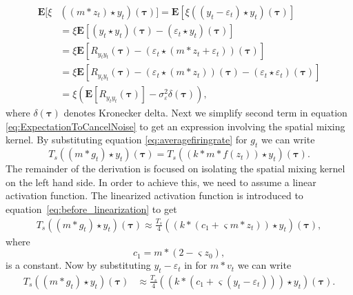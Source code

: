 \documentclass[10pt,twocolumn,twoside]{IEEEtran}
\begin{document}
\begin{align}
	\mathbf{E}[\xi&\left(\left(m \ast z_t \right) \star y_t \right)(\boldsymbol{\tau})] = \mathbf{E}\left[\xi\left(\left(y_t-\varepsilon_t\right) \star y_t \right)(\boldsymbol{\tau})\right] \nonumber \\
	&= \xi \mathbf{E}\left[ (y_t \star y_t)(\boldsymbol{\tau}) - \left(\varepsilon_t\star y_t \right)(\boldsymbol{\tau})\right] \nonumber \\
	&= \xi\mathbf{E}[ R_{y_ty_t}(\boldsymbol{\tau})  - \left(\varepsilon_t \star (m\ast z_t + \varepsilon_t)\right) (\boldsymbol{\tau})] \nonumber \\
	&=\xi\mathbf{E}[ R_{y_ty_t}(\boldsymbol{\tau}) -\left(\varepsilon_t\star (m\ast z_t)\right)(\boldsymbol{\tau}) - (\varepsilon_t\star\varepsilon_t)(\boldsymbol{\tau})] \nonumber\\ 
	&= \xi\left(\mathbf{E}[ R_{y_ty_t}(\boldsymbol{\tau})] - \sigma_{\varepsilon}^2 \delta(\boldsymbol{\tau})\right), \label{eq:FirstTermReduced}
\end{align}
where $\delta(\boldsymbol\tau)$ denotes Kronecker delta.
Next we simplify second term in equation \eqref{eq:ExpectationToCancelNoise} to get an expression involving the spatial mixing kernel.
By substituting equation \eqref{eq:averagefiringrate} for $g_t$ we can write
\begin{equation}\label{eq:before_linearization}
	T_s((m \ast g_t) \star y_t)(\boldsymbol\tau) = T_s((k \ast m\ast f(z_t)) \star y_t)(\boldsymbol\tau).
\end{equation}   
The remainder of the derivation is focused on isolating the spatial mixing kernel on the left hand side.
In order to achieve this, we need to assume a linear activation function.
The linearized activation function is introduced to equation~\eqref{eq:before_linearization} to get
\begin{align}	
	T_s((m \ast g_t) \star y_t)(\boldsymbol\tau) \approx \frac{T_s}{4}((k\ast (c_1 + \varsigma m \ast z_t)) \star y_t)(\boldsymbol\tau), 
\end{align}
where
\begin{equation}
	c_1 = m\ast (2 - \varsigma z_0),
\end{equation}
is a constant.
Now by substituting $y_t - \varepsilon_t$ in for $m\ast v_t$ we can write
\begin{align}
	T_s((m \ast g_t) \star y_t)(\boldsymbol\tau) &\approx \frac{T_s}{4}((k\ast (c_1 + \varsigma (y_t - \varepsilon_t))) \star y_t) (\boldsymbol\tau).
\end{align}
\end{document}
